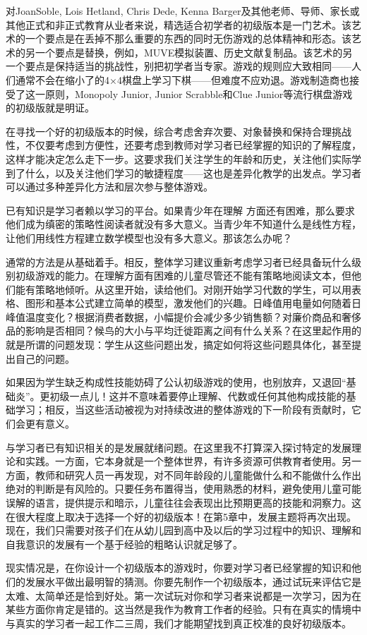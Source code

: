 对JoanSoble, Lois Hetland, Chris Dede, Kenna Barger及其他老师、导师、家长或其他正式和非正式教育从业者来说，精选适合初学者的初级版本是一门艺术。该艺术的一个要点是在丢掉不那么重要的东西的同时无伤游戏的总体精神和形态。该艺术的另一个要点是替换，例如，MUVE模拟装置、历史文献复制品。该艺术的另一个要点是保持适当的挑战性，别把初学者当专家。游戏的规则应大致相同——人们通常不会在缩小了的4×4棋盘上学习下棋——但难度不应劝退。游戏制造商也接受了这一原则，Monopoly Junior, Junior Scrabble和Clue Junior等流行棋盘游戏的初级版就是明证。

在寻找一个好的初级版本的时候，综合考虑舍弃次要、对象替换和保持合理挑战性，不仅要考虑到方便性，还要考虑到教师对学习者已经掌握的知识的了解程度，这样才能决定怎么走下一步。这要求我们关注学生的年龄和历史，关注他们实际学到了什么，以及关注他们学习的敏捷程度——这也是差异化教学的出发点。学习者可以通过多种差异化方法和层次参与整体游戏。

已有知识是学习者赖以学习的平台。如果青少年在理解 方面还有困难，那么要求他们成为缜密的策略性阅读者就没有多大意义。当青少年不知道什么是线性方程，让他们用线性方程建立数学模型也没有多大意义。那该怎么办呢？

通常的方法是从基础着手。相反，整体学习建议重新考虑学习者已经具备玩什么级别初级游戏的能力。在理解方面有困难的儿童尽管还不能有策略地阅读文本，但他们能有策略地倾听。从这里开始，读给他们。对刚开始学习代数的学生，可以用表格、图形和基本公式建立简单的模型，激发他们的兴趣。日峰值用电量如何随着日峰值温度变化？根据消费者数据，小幅提价会减少多少销售额？对廉价商品和奢侈品的影响是否相同？候鸟的大小与平均迁徙距离之间有什么关系？在这里起作用的就是所谓的问题发现：学生从这些问题出发，搞定如何将这些问题具体化，甚至提出自己的问题。

如果因为学生缺乏构成性技能妨碍了公认初级游戏的使用，也别放弃，又退回“基础炎”。更初级一点儿！这并不意味着要停止理解、代数或任何其他构成技能的基础学习；相反，当这些活动被视为对持续改进的整体游戏的下一阶段有贡献时，它们会更有意义。

与学习者已有知识相关的是发展就绪问题。在这里我不打算深入探讨特定的发展理论和实践。一方面，它本身就是一个整体世界，有许多资源可供教育者使用。另一方面，教师和研究人员一再发现，对不同年龄段的儿童能做什么和不能做什么作出绝对的判断是有风险的。只要任务布置得当，使用熟悉的材料，避免使用儿童可能误解的语言，提供提示和暗示，儿童往往会表现出比预期更高的技能和洞察力。这在很大程度上取决于选择一个好的初级版本！在第5章中，发展主题将再次出现。现在，我们只需要对孩子们在从幼儿园到高中及以后的学习过程中的知识、理解和自我意识的发展有一个基于经验的粗略认识就足够了。

现实情况是，在你设计一个初级版本的游戏时，你要对学习者已经掌握的知识和他们的发展水平做出最明智的猜测。你要先制作一个初级版本，通过试玩来评估它是太难、太简单还是恰到好处。第一次试玩对你和学习者来说都是一次学习，因为在某些方面你肯定是错的。这当然是我作为教育工作者的经验。只有在真实的情境中与真实的学习者一起工作二三周，我们才能期望找到真正校准的良好初级版本。

